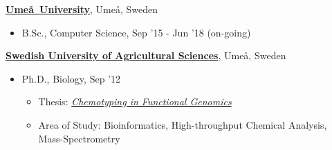 \documentclass[10pt]{article}
\newenvironment{outerlist}[1][\enskip\textbullet]%
                                              {\begin{itemize}[#1,leftmargin=*]}{\end{itemize}%
                                                \vspace{-.6\baselineskip}}
\newenvironment{innerlist}[1][\enskip\textbullet]%
                                                                            {\begin{itemize}[#1,leftmargin=*,parsep=0pt,itemsep=0pt,topsep=0pt,partopsep=0pt]}
                                                                            {\end{itemize}}
\newcommand{\blankline}{\quad\pagebreak[3]}
\begin{document}
                                                                                           \href{http://www.umu.se/}{\textbf{Ume\aa\ University}}, Ume\aa, Sweden

                                                                                           \begin{outerlist}
                                                                                           \item[] B.Sc., Computer Science, Sep '15 - Jun '18 (on-going)
                                                                                           \end{outerlist}

                                                                                           \blankline


                                                                                           \href{http://www.slu.se/}{\textbf{Swedish University of Agricultural Sciences}},
                                                                                           Ume\aa, Sweden
                                                                                           \begin{outerlist}

                                                                                           \item[] Ph.D., Biology, Sep '12
                                                                                             \begin{innerlist}
                                                                                             \item Thesis: \href{http://pub.epsilon.slu.se/8994/}{\emph{Chemotyping in Functional Genomics}}
                                                                                             \item Area of Study: Bioinformatics, High-throughput Chemical Analysis, Mass-Spectrometry
                                                                                             \end{innerlist}

                                                                                           \end{outerlist}

                                                                                           \blankline
\end{document}
